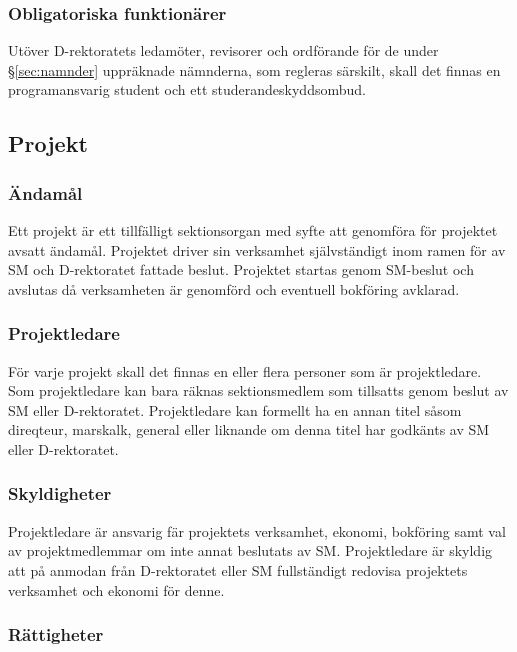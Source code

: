 \documentclass{dgovdoc}
\begin{document}
\subsubsection{Obligatoriska funktionärer}

Utöver D-rektoratets ledamöter, revisorer och ordförande för de under
\S\ref{sec:namnder} uppräknade nämnderna, som regleras särskilt, skall det
finnas en programansvarig student och ett studerandeskyddsombud.

\subsection{Projekt}

\subsubsection{Ändamål}

Ett projekt är ett tillfälligt sektionsorgan med syfte att genomföra för
projektet avsatt ändamål. Projektet driver sin verksamhet självständigt inom
ramen för av SM och D-rektoratet fattade beslut. Projektet startas genom
SM-beslut och avslutas då verksamheten är genomförd och eventuell bokföring
avklarad.

\subsubsection{Projektledare}

För varje projekt skall det finnas en eller flera personer som är
projektledare. Som projektledare kan bara räknas sektionsmedlem som tillsatts
genom beslut av SM eller D-rektoratet. Projektledare kan formellt ha en annan
titel såsom direqteur, marskalk, general eller liknande om denna titel har
godkänts av SM eller D-rektoratet.

\subsubsection{Skyldigheter}

Projektledare är ansvarig fär projektets verksamhet, ekonomi, bokföring samt
val av projektmedlemmar om inte annat beslutats av SM. Projektledare är
skyldig att på anmodan från D-rektoratet eller SM fullständigt redovisa
projektets verksamhet och ekonomi för denne.

\subsubsection{Rättigheter}
\end{document}
